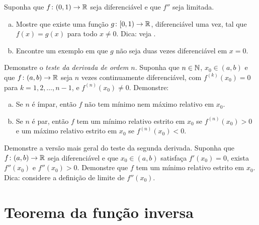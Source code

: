 \begin{exercise} \label{exercise:extendboundedder2}
Suponha que $f \colon (0,1) \to {\mathbb{R}}$ seja diferenciável e que $f''$
seja limitada.
\begin{enumerate}[a)]
\item
Mostre que existe uma função $g \colon [0,1) \to {\mathbb{R}}$, diferenciável uma vez, tal que $f(x)=g(x)$ para todo $x \neq 0$. Dica: veja .
\item
Encontre um exemplo em que $g$ não seja duas vezes diferenciável em $x=0$.
\end{enumerate}
\end{exercise}

\begin{exercise}
Demonstre o \emph{teste da derivada de ordem $n$}.
Suponha que $n \in {\mathbb{N}}$, $x_0 \in (a,b)$ e que $f \colon (a,b) \to {\mathbb{R}}$ seja $n$ vezes continuamente diferenciável, com $f^{(k)}(x_0)=0$ para $k=1,2,\ldots,n-1$, e
$f^{(n)}(x_0)
\neq 0$.
Demonstre:
\begin{enumerate}[a)]
\item
Se $n$ é ímpar, então $f$ não tem mínimo nem máximo relativo em $x_0$.
\item
Se $n$ é par, então $f$ tem um mínimo relativo estrito em $x_0$ se
$f^{(n)}(x_0) > 0$
e um máximo relativo estrito em $x_0$ se $f^{(n)}(x_0) < 0$.
\end{enumerate}
\end{exercise}

\begin{exercise}
Demonstre a versão mais geral do teste da segunda derivada.
Suponha que $f \colon (a,b) \to {\mathbb{R}}$ seja diferenciável e que $x_0 \in (a,b)$ satisfaça $f'(x_0)=0$, exista $f''(x_0)$ e $f''(x_0)>0$.
Demonstre que $f$ tem um mínimo relativo estrito em $x_0$. Dica: considere a definição de limite de $f''(x_0)$.

\end{exercise}


\sectionnewpage
\section{Teorema da função inversa}
\label{sec:ift}



